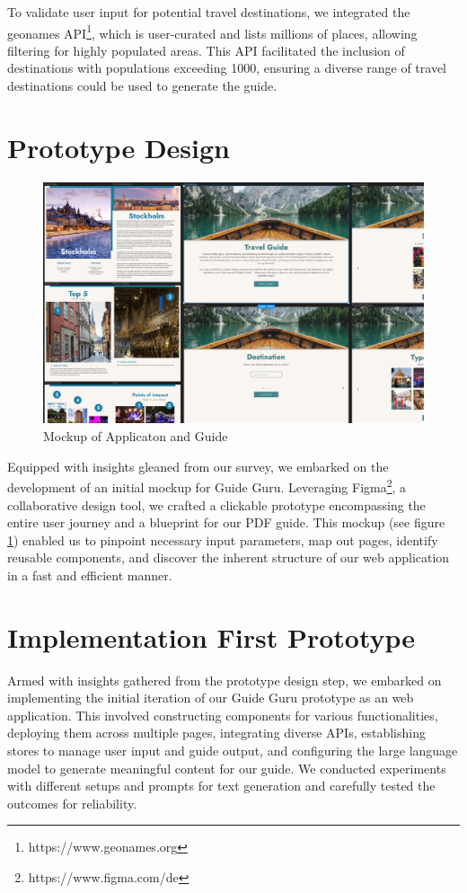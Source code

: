 \documentclass[english,notitlepage,smartquotes]{hgbreport}
\begin{document}
To validate user input for potential travel destinations, we integrated the geonames API\footnote{https://www.geonames.org}, which is user-curated and lists millions of places, allowing filtering for highly populated areas. This API facilitated the inclusion of destinations with populations exceeding 1000, ensuring a diverse range of travel destinations could be used to generate the guide.

\section{Prototype Design}

\begin{figure}
	\centering
	\includegraphics[width=1\textwidth]{Mockup_Example.png}
	\caption{Mockup of Applicaton and Guide}
	\label{fig1}
\end{figure}

Equipped with insights gleaned from our survey, we embarked on the development of an initial mockup for Guide Guru. Leveraging Figma\footnote{https://www.figma.com/de}, a collaborative design tool, we crafted a clickable prototype encompassing the entire user journey and a blueprint for our PDF guide. This mockup (see figure  \ref{fig1}) enabled us to pinpoint necessary input parameters, map out pages, identify reusable components, and discover the inherent structure of our web application in a fast and efficient manner.


\section{Implementation First Prototype}
 
Armed with insights gathered from the prototype design step, we embarked on implementing the initial iteration of our Guide Guru prototype as an web application. This involved constructing components for various functionalities, deploying them across multiple pages, integrating diverse APIs, establishing stores to manage user input and guide output, and configuring the large language model to generate meaningful content for our guide. We conducted experiments with different setups and prompts for text generation and carefully tested the outcomes for reliability.
\end{document}
